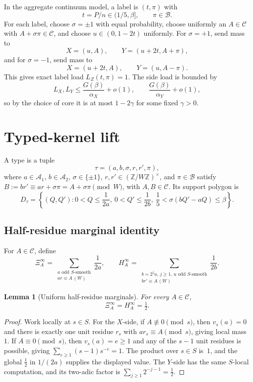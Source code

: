 \documentclass[11pt]{article}
\newtheorem{lemma}[theorem]{Lemma}
\newcommand{\B}{\mathcal B}
\newcommand{\C}{\mathcal C}
\begin{document}
In the aggregate continuum model, a label is \((t,\pi)\) with
\[
  t=P/n\in(1/5,\beta],\qquad \pi\in\B.
\]
For each label, choose \(\sigma=\pm1\) with equal probability, choose uniformly
an \(A\in\C\) with \(A+\sigma\pi\in\C\), and choose \(u\in(0,1-2t)\) uniformly.
For \(\sigma=+1\), send mass to
\[
  X=(u,A),\qquad Y=(u+2t,A+\pi),
\]
and for \(\sigma=-1\), send mass to
\[
  X=(u+2t,A),\qquad Y=(u,A-\pi).
\]
This gives exact label load \(L_Z(t,\pi)=1\).  The side load is bounded by
\[
  L_X,L_Y\le \frac{G(\beta)}{\alpha_X}+o(1),\qquad
  \frac{G(\beta)}{\alpha_Y}+o(1),
\]
so by the choice of core it is at most \(1-2\gamma\) for some fixed
\(\gamma>0\).

\section{Typed-kernel lift}

A type is a tuple
\[
  \tau=(a,b,\sigma,r,r',\pi),
\]
where \(a\in\mathcal A_1\), \(b\in\mathcal A_2\), \(\sigma\in\{\pm1\}\),
\(r,r'\in(\mathbb Z/W\mathbb Z)^\times\), and \(\pi\in\B\) satisfy
\(B:=br'\equiv ar+\sigma\pi=A+\sigma\pi\pmod W\), with \(A,B\in\C\).
Its support polygon is
\[
  D_\tau=\left\{(Q,Q'):0<Q\le\frac1{2a},\
  0<Q'\le\frac1{2b},\
  \frac15<\sigma(bQ'-aQ)\le\beta\right\}.
\]

\subsection*{Half-residue marginal identity}

For \(A\in\C\), define
\[
  \Xi_A^\infty
  =\sum_{\substack{a\text{ odd }S\text{-smooth}\\ ar\equiv A\,(W)}}\frac1{2a},
  \qquad
  H_A^\infty
  =\sum_{\substack{b=2^ju,\,j\ge1,\,u\text{ odd }S\text{-smooth}\\
                   br'\equiv A\,(W)}}\frac1{2b}.
\]

\begin{lemma}[Uniform half-residue marginals]
For every \(A\in\C\),
\[
  \Xi_A^\infty=H_A^\infty=\tfrac12.
\]
\end{lemma}

\begin{proof}
Work locally at \(s\in S\).  For the \(X\)-side, if \(A\not\equiv0\pmod s\),
then \(v_s(a)=0\) and there is exactly one unit residue \(r_s\) with
\(ar_s\equiv A\pmod s\), giving local mass~\(1\).  If \(A\equiv0\pmod s\),
then \(v_s(a)=e\ge1\) and any of the \(s-1\) unit residues is possible,
giving \(\sum_{e\ge1}(s-1)s^{-e}=1\).  The product over \(s\in S\) is~\(1\),
and the global \(\tfrac12\) in \(1/(2a)\) supplies the displayed value.  The
\(Y\)-side has the same \(S\)-local computation, and its two-adic factor is
\(\sum_{j\ge1}2^{-j-1}=\tfrac12\).
\end{proof}
\end{document}
